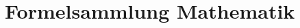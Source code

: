\documentclass[a4paper,10pt,fleqn]{article}
\begin{document}
\tableofcontents
\section{Formelsammlung Mathematik}
\end{document}
